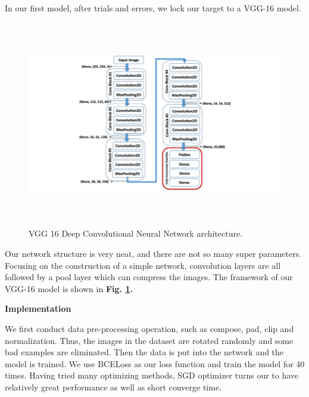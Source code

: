\documentclass[a4paper]{article}
\begin{document}
\large{
In our first model, after trials and errors, we lock our target to a \textsf{VGG-16} model. 

\vspace{5mm}

\begin{figure}[H]
\centering
\includegraphics[width=16cm,height=9cm]{A-schematic-of-the-VGG-16-Deep-Convolutional-Neural-Network-DCNN-architecture-trained.png}
\caption{\textsf{VGG 16 Deep Convolutional Neural Network architecture.}}
\label{vgg16}
\end{figure}
\vspace{5mm}
Our network structure is very neat, and there are not so many super parameters. Focusing on the construction of a simple network, convolution layers are all followed by a pool layer which can compress the images. The framework of our \textsf{VGG-16} model is shown in \textbf{Fig. \ref{vgg16}.}

}

\vspace{2mm}
\begin{center}
\large\textbf{Implementation} \\
\end{center}

\large{

We first conduct data pre-processing operation, such as compose, pad, clip and normalization. Thus, the images in the dataset are rotated randomly and some bad examples are eliminated. Then the data is put into the network and the model is trained. We use \textsf{BCELoss} as our loss function and train the model for 40 times. Having tried many optimizing methods, \textsf{SGD} optimizer turns our to have relatively great performance as well as short converge time.

}
\end{document}

